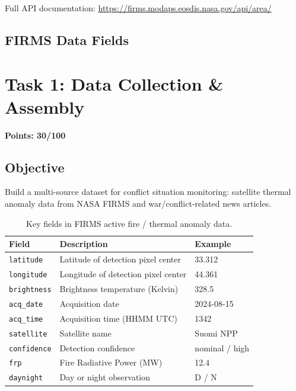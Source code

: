 \documentclass[11pt]{article}
\begin{document}
Full API documentation: \url{https://firms.modaps.eosdis.nasa.gov/api/area/}

\subsection{FIRMS Data Fields}

\section{Task 1: Data Collection \& Assembly}
\noindent\textbf{Points: 30/100}

\subsection{Objective}
Build a multi-source dataset for conflict situation monitoring: satellite thermal anomaly data from NASA FIRMS and war/conflict-related news articles.

\begin{table}[h]
\centering
\begin{tabular}{lll}
\toprule
\textbf{Field} & \textbf{Description} & \textbf{Example} \\
\midrule
\texttt{latitude} & Latitude of detection pixel center & 33.312 \\
\texttt{longitude} & Longitude of detection pixel center & 44.361 \\
\texttt{brightness} & Brightness temperature (Kelvin) & 328.5 \\
\texttt{acq\_date} & Acquisition date & 2024-08-15 \\
\texttt{acq\_time} & Acquisition time (HHMM UTC) & 1342 \\
\texttt{satellite} & Satellite name & Suomi NPP \\
\texttt{confidence} & Detection confidence & nominal / high \\
\texttt{frp} & Fire Radiative Power (MW) & 12.4 \\
\texttt{daynight} & Day or night observation & D / N \\
\bottomrule
\end{tabular}
\caption{Key fields in FIRMS active fire / thermal anomaly data.}
\end{table}
\end{document}
